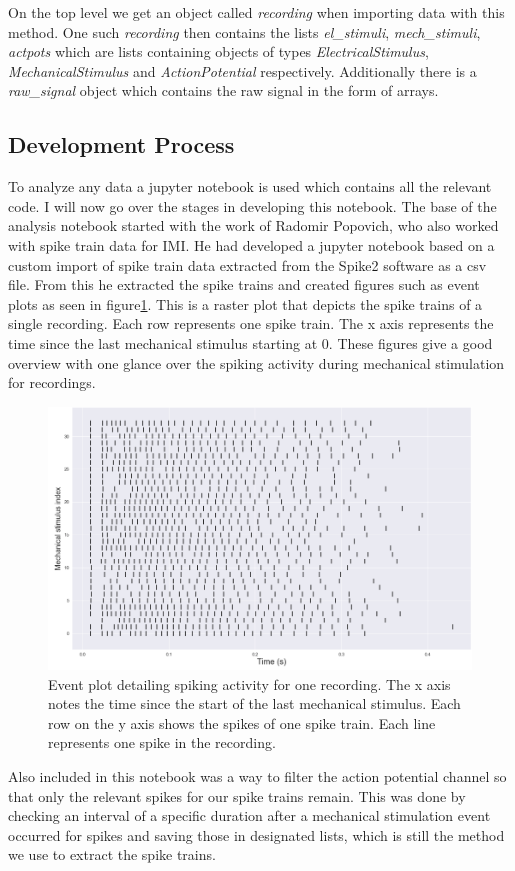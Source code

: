 On the top level we get an object called \textit{recording} when importing data with this method. One such \textit{recording} then contains the lists \textit{el\_stimuli}, \textit{mech\_stimuli}, \textit{actpots} which are lists containing objects of types \textit{ElectricalStimulus}, \textit{MechanicalStimulus} and \textit{ActionPotential} respectively. Additionally there is a \textit{raw\_signal} object which contains the raw signal in the form of arrays.


\subsection{Development Process}
To analyze any data a jupyter notebook is used which contains all the relevant code. I will now go over the stages in developing this notebook.
The base of the analysis notebook started with the work of Radomir Popovich, who also worked with spike train data for IMI. He had developed a jupyter notebook based on a custom import of spike train data extracted from the Spike2 software as a csv file. From this he extracted the spike trains and created figures such as event plots as seen in figure\ref{fig:eventplot}. This is a raster plot that depicts the spike trains of a single recording. Each row represents one spike train. The x axis represents the time since the last mechanical stimulus starting at 0. These figures give a good overview with one glance over the spiking activity during mechanical stimulation for recordings.
\begin{figure}
	\includegraphics[width = \textwidth]{src/pic/event_plot}
	\caption{Event plot detailing spiking activity for one recording. The x axis notes the time since the start of the last mechanical stimulus. Each row on the y axis shows the spikes of one spike train. Each line represents one spike in the recording.}
	\label{fig:eventplot}
\end{figure}
Also included in this notebook was a way to filter the action potential channel so that only the relevant spikes for our spike trains remain. This was done by checking an interval of a specific duration after a mechanical stimulation event occurred for spikes and saving those in designated lists, which is still the method we use to extract the spike trains.

